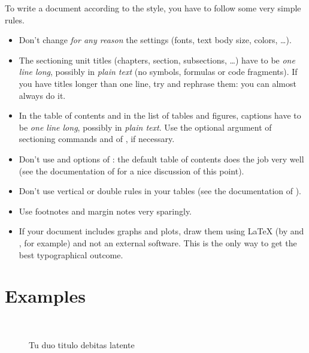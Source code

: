 To write a document according to the \arsclassica{} style, you have to follow some very simple rules.
\begin{itemize}
\item Don't change \emph{for any reason} the \arsclassica{} settings (fonts, text body size, colors, \dots).
\item The sectioning unit titles (chapters, section, subsections, \dots) have to be \emph{one line long}, possibly in \emph{plain text} (no symbols, formulas or code fragments). If you have titles longer than one line, try and rephrase them: you can almost always do it.
\item In the table of contents and in the list of tables and figures, captions have to be \emph{one line long}, possibly in \emph{plain text}. Use the optional argument of sectioning commands and of , if necessary.
\item Don't use  and  options of \classicthesis: the default table of contents does the job very well (see the documentation of \classicthesis{} for a nice discussion of this point).
\item Don't use vertical or double rules in your tables (see the documentation of ).
\item Use footnotes and margin notes very sparingly.
\item If your document includes graphs and plots, draw them using \LaTeX{} (by  and , for example) and not an external software. This is the only way to get the best typographical outcome.
\end{itemize}



\section{Examples}

\begin{figure}
\centering
{} \quad
{} \\
 \quad
{}
\caption[Tu duo titulo debitas latente]{Tu duo titulo debitas latente}
\label{fig:example}
\end{figure}

